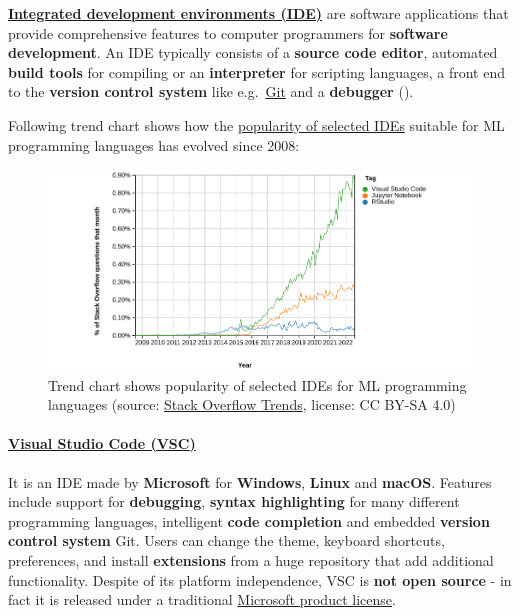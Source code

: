 \documentclass [oneside,10pt,a4paper,ngerman,BCOR10mm,headsepline,parindent,final]{scrartcl}
\begin{document}
\textbf{\href{https://en.wikipedia.org/wiki/Integrated_development_environment}{Integrated
development environments (IDE)}} are software applications that provide
comprehensive features to computer programmers for \textbf{software
development}. An IDE typically consists of a \textbf{source code
editor}, automated \textbf{build tools} for compiling or an
\textbf{interpreter} for scripting languages, a front end to the
\textbf{version control system} like
e.g.~\href{https://en.wikipedia.org/wiki/Git}{Git} and a
\textbf{debugger} (\cite{Wiki_IDE}).

Following trend chart shows how the
\href{https://insights.stackoverflow.com/trends?tags=rstudio\%2Cjupyter-notebook\%2Cvisual-studio-code}{popularity
of selected IDEs} suitable for ML programming languages has evolved
since 2008:

\begin{figure}
\centering
\includegraphics{images/2022-09-07_StackOverflowTrends_IDEs_wide.png}
\caption{Trend chart shows popularity of selected IDEs for ML
programming languages (source:
\href{https://insights.stackoverflow.com/trends?tags=rstudio\%2Cjupyter-notebook\%2Cvisual-studio-code}{Stack
Overflow Trends}, license: CC BY-SA 4.0)}
\end{figure}

    \hypertarget{visual-studio-code-vsc}{%
\paragraph{\texorpdfstring{\href{https://en.wikipedia.org/wiki/Visual_Studio_Code}{Visual
Studio Code
(VSC)}}{Visual Studio Code (VSC)}}\label{visual-studio-code-vsc}}

It is an IDE made by \textbf{Microsoft} for \textbf{Windows},
\textbf{Linux} and \textbf{macOS}. Features include support for
\textbf{debugging}, \textbf{syntax highlighting} for many different
programming languages, intelligent \textbf{code completion} and embedded
\textbf{version control system} Git. Users can change the theme,
keyboard shortcuts, preferences, and install \textbf{extensions} from a
huge repository that add additional functionality. Despite of its
platform independence, VSC is \textbf{not open source} - in fact it is
released under a traditional
\href{https://code.visualstudio.com/License/}{Microsoft product
license}.
\end{document}
